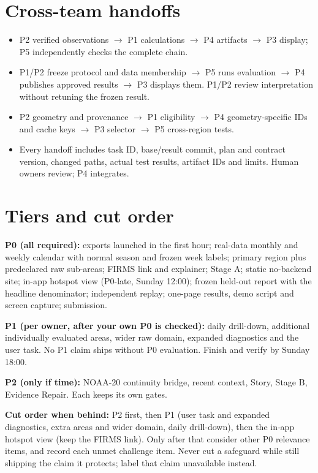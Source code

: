 \documentclass[10pt]{article}
\begin{document}
\section*{Cross-team handoffs}
\begin{itemize}
\item P2 verified observations $\rightarrow$ P1 calculations $\rightarrow$ P4 artifacts $\rightarrow$ P3 display; P5 independently checks the complete chain.
\item P1/P2 freeze protocol and data membership $\rightarrow$ P5 runs evaluation $\rightarrow$ P4 publishes approved results $\rightarrow$ P3 displays them. P1/P2 review interpretation without retuning the frozen result.
\item P2 geometry and provenance $\rightarrow$ P1 eligibility $\rightarrow$ P4 geometry-specific IDs and cache keys $\rightarrow$ P3 selector $\rightarrow$ P5 cross-region tests.
\item Every handoff includes task ID, base/result commit, plan and contract version, changed paths, actual test results, artifact IDs and limits. Human owners review; P4 integrates.
\end{itemize}

\section*{Tiers and cut order}
\textbf{P0 (all required):} exports launched in the first hour; real-data monthly and weekly calendar with normal season and frozen week labels; primary region plus predeclared raw sub-areas; FIRMS link and explainer; Stage A; static no-backend site; in-app hotspot view (P0-late, Sunday 12:00); frozen held-out report with the headline denominator; independent replay; one-page results, demo script and screen capture; submission.

\textbf{P1 (per owner, after your own P0 is checked):} daily drill-down, additional individually evaluated areas, wider raw domain, expanded diagnostics and the user task. No P1 claim ships without P0 evaluation. Finish and verify by Sunday 18:00.

\textbf{P2 (only if time):} NOAA-20 continuity bridge, recent context, Story, Stage B, Evidence Repair. Each keeps its own gates.

\textbf{Cut order when behind:} P2 first, then P1 (user task and expanded diagnostics, extra areas and wider domain, daily drill-down), then the in-app hotspot view (keep the FIRMS link). Only after that consider other P0 relevance items, and record each unmet challenge item. Never cut a safeguard while still shipping the claim it protects; label that claim unavailable instead.
\end{document}
